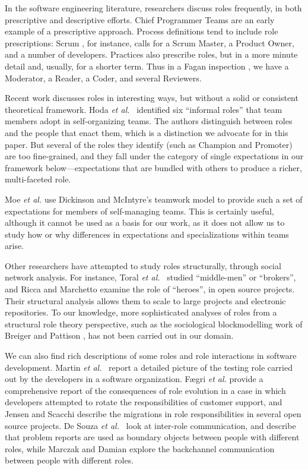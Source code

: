 \documentclass[10pt, conference, compsocconf]{IEEEtran}
\begin{document}
In the software engineering literature, researchers discuss roles frequently, in both prescriptive and descriptive efforts. Chief Programmer Teams \cite{Baker1972} are an early example of a prescriptive approach. Process definitions tend to include role prescriptions: Scrum \cite{Schwaber2001}, for instance, calls for a Scrum Master, a Product Owner, and a number of developers. Practices also prescribe roles, but in a more minute detail and, usually, for a shorter term. Thus in a Fagan inspection \cite{Fagan1976}, we have a Moderator, a Reader, a Coder, and several Reviewers.

Recent work discusses roles in interesting ways, but without a solid or consistent theoretical framework. Hoda \emph{et al.}\ \cite{Hoda2010} identified six ``informal roles'' that team members adopt in self-organizing teams. The authors distinguish between roles and the people that enact them, which is a distinction we advocate for in this paper. But several of the roles they identify (such as Champion and Promoter) are too fine-grained, and they fall under the category of single expectations in our framework below---expectations that are bundled with others to produce a richer, multi-faceted role.

Moe \emph{et al.} \cite{Moe2010} use Dickinson and McIntyre's \cite{Dickinson1997} teamwork model to provide such a set of expectations for members of self-managing teams. This is certainly useful, although it cannot be used as a basis for our work, as it does not allow us to study how or why differences in expectations and specializations within teams arise.

Other researchers have attempted to study roles structurally, through social network analysis. For instance, Toral \emph{et al.}\ \cite{Toral2010} studied ``middle-men'' or ``brokers'', and Ricca and Marchetto \cite{Ricca2010} examine the role of ``heroes'', in open source projects. Their structural analysis allows them to scale to large projects and electronic repositories. To our knowledge, more sophisticated analyses of roles from a structural role theory perspective, such as the sociological blockmodelling work of Breiger and Pattison \cite{Breiger1986}, has not been carried out in our domain.

We can also find rich descriptions of some roles and role interactions in software development. Martin \emph{et al.}\ \cite{Martin2007} report a detailed picture of the testing role carried out by the developers in a software organization. F{\ae}gri \emph{et al.} \cite{Faegri2010} provide a comprehensive report of the consequences of role evolution in a case in which developers attempted to rotate the responsibilities of customer support, and Jensen and Scacchi \cite{Jensen2007} describe the migrations in role responsibilities in several open source projects. De Souza \emph{et al.}\ \cite{deSouza2003} look at inter-role communication, and describe that problem reports are used as boundary objects \cite{Bowker1999} between people with different roles, while Marczak and Damian \cite{Marczak2011} explore the backchannel communication between people with different roles.
\end{document}
